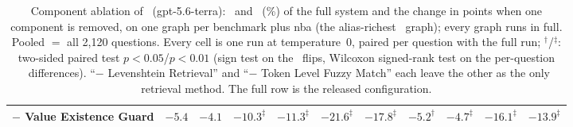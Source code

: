 \begin{table}[t]
\begin{tabular}{l rr rr rr rr rr}
\quad $-$ Value Existence Guard & $-5.4$ & $-4.1$ & $-10.3^{\ddagger}$ & $-11.3^{\ddagger}$ & $-21.6^{\ddagger}$ & $-17.8^{\ddagger}$ & $-5.2^{\dagger}$ & $-4.7^{\ddagger}$ & $-16.1^{\ddagger}$ & $-13.9^{\ddagger}$ \\
\bottomrule
\end{tabular}
\caption{Component ablation of \method\ (gpt-5.6-terra): \ea\ and \psjs\ (\%) of the full system and the change in points when one component is removed, on one graph per benchmark plus nba (the alias-richest \cypherbench\ graph); every graph runs in full. Pooled $=$ all 2{,}120 questions. Every cell is one run at temperature~0, paired per question with the full run; $^{\dagger}$/$^{\ddagger}$: two-sided paired test $p<0.05$/$p<0.01$ (sign test on the \ea\ flips, Wilcoxon signed-rank test on the per-question \psjs\ differences). ``$-$ Levenshtein Retrieval'' and ``$-$ Token Level Fuzzy Match'' each leave the other as the only retrieval method. The full row is the released configuration.}
\label{tab:ablation-components}
\end{table}
